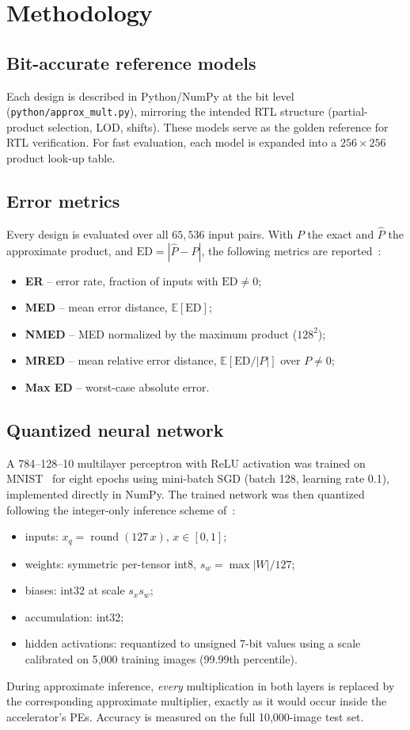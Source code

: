 \documentclass[11pt,a4paper]{article}
\begin{document}
\section{Methodology}

\subsection{Bit-accurate reference models}
Each design is described in Python/NumPy at the bit level
(\texttt{python/approx\_mult.py}), mirroring the intended RTL structure
(partial-product selection, LOD, shifts). These models serve as the golden
reference for RTL verification. For fast evaluation, each model is expanded
into a $256\times256$ product look-up table.

\subsection{Error metrics}
Every design is evaluated over all $65{,}536$ input pairs. With
$P$ the exact and $\hat P$ the approximate product, and
$\text{ED}=|\hat P - P|$, the following metrics are reported~\cite{jiang2020survey}:
\begin{itemize}[nosep]
  \item \textbf{ER} -- error rate, fraction of inputs with $\text{ED}\neq 0$;
  \item \textbf{MED} -- mean error distance, $\mathbb{E}[\text{ED}]$;
  \item \textbf{NMED} -- MED normalized by the maximum product ($128^2$);
  \item \textbf{MRED} -- mean relative error distance, $\mathbb{E}[\text{ED}/|P|]$ over $P\neq0$;
  \item \textbf{Max ED} -- worst-case absolute error.
\end{itemize}

\subsection{Quantized neural network}
A 784--128--10 multilayer perceptron with ReLU activation was trained on
MNIST~\cite{lecun1998} for eight epochs using mini-batch SGD
(batch 128, learning rate 0.1), implemented directly in NumPy.
The trained network was then quantized following the integer-only inference
scheme of~\cite{jacob2018}:
\begin{itemize}[nosep]
  \item inputs: $x_q = \operatorname{round}(127\,x)$, $x\in[0,1]$;
  \item weights: symmetric per-tensor int8, $s_w = \max|W|/127$;
  \item biases: int32 at scale $s_x s_w$;
  \item accumulation: int32;
  \item hidden activations: requantized to unsigned 7-bit values using a scale
        calibrated on 5{,}000 training images (99.99th percentile).
\end{itemize}
During approximate inference, \emph{every} multiplication in both layers is
replaced by the corresponding approximate multiplier, exactly as it would
occur inside the accelerator's PEs. Accuracy is measured on the full
10{,}000-image test set.
\end{document}
